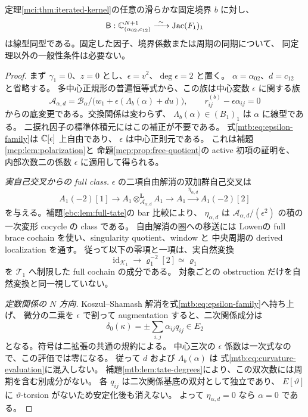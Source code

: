 \begin{proposition}[横断二項写像の可逆性]
\label{mtb:prop:transverse-iso}
定理\ref{mci:thm:iterated-kernel}の任意の滑らかな固定境界 $b$ に対し、
\begin{equation}\label{mtb:eq:transverse-iso}
 \mathsf B:\mathbb C^{N+1}_{(\alpha_{02},c_{12})}
         \xrightarrow{\ \sim\ }\operatorname{Jac}(F_1)_1
\end{equation}
は線型同型である。固定した因子、境界係数または周期の同期について、
同定理以外の一般性条件は必要ない。
\end{proposition}

\begin{proof}
まず $\gamma_1=0$、$z=0$ とし、$\epsilon=v^2$、$\deg\epsilon=2$ と置く。
$\alpha=\alpha_{02}$、$d=c_{12}$ と省略する。
多中心正規形の普遍恒等式から、この族は中心変数 $\epsilon$ に関する族
\begin{equation}\label{mtb:eq:epsilon-family}
 \mathcal A_{\alpha,d}=\mathcal B_\alpha/
       \bigl(w_1+\epsilon(\Lambda_b(\alpha)+du)\bigr),
 \qquad r_{ij}^{(b)}-\epsilon\alpha_{ij}=0
\end{equation}
からの底変更である。交換関係は変わらず、
$\Lambda_b(\alpha)\in (B_1)_1$ は $\alpha$ に線型である。
二捩れ因子の標準体積元にはこの補正が不要である。
式\eqref{mtb:eq:epsilon-family}は $\mathbb C[\epsilon]$ 上自由であり、
$\epsilon$ は中心正則元である。
これは補題\ref{mcp:lem:polarization}と
命題\ref{mcp:prop:free-quotient}の active 初項の証明を、
内部次数二の係数 $\epsilon$ に適用して得られる。

\emph{実自己交叉からの full class.}
$\epsilon$ の二項自由解消の双加群自己交叉は
\[
 A_1(-2)[1]\longrightarrow
 A_1\otimes_{\mathcal A_{\alpha,d}}^{\mathbf L}A_1
 \longrightarrow A_1\xrightarrow{\eta_{\alpha,d}}A_1(-2)[2]
\]
を与える。補題\ref{ebc:lem:full-tate}の bar 比較により、
$\eta_{\alpha,d}$ は $\mathcal A_{\alpha,d}/(\epsilon^2)$ の積の
一次変形 cocycle の class である。
自由解消の圏への移送には
Lowen\cite[Theorems~3.21, 4.15 and proof]{CMOLowenCharacteristic}の
full brace cochain を使い、singularity quotient、window と
中央周期の derived localization を通す。
従って以下の零項と一項は、実自然変換
\[
 \operatorname{id}_{\mathcal K_1}\longrightarrow
       \varrho_1^{-2}[2]\simeq\varrho_1
\]
を $\mathcal T_1$ へ制限した full cochain の成分である。
対象ごとの obstruction だけを自然変換と同一視していない。

\emph{定数関係の $N$ 方向.}
Koszul--Shamash 解消を式\eqref{mtb:eq:epsilon-family}へ持ち上げ、
微分の二乗を $\epsilon$ で割って augmentation すると、二次関係成分は
\begin{equation}\label{mtb:eq:curvature-evaluation}
            \delta_0(\kappa)=\pm\sum_{i,j}\alpha_{ij}q_{ij}\in E_2
\end{equation}
となる。符号は二拡張の共通の規約による。
中心三次の $\epsilon$ 係数は一次式なので、この評価では零になる。
従って $d$ および $\Lambda_b(\alpha)$ は
式\eqref{mtb:eq:curvature-evaluation}に混入しない。
補題\ref{mtb:lem:tate-degrees}により、この双次数には周期を含む別成分がない。
各 $q_{ij}$ は二次関係基底の双対として独立であり、
$E[\vartheta]$ に $\vartheta$-torsion がないため安定化後も消えない。
よって $\eta_{\alpha,d}=0$ なら $\alpha=0$ である。


\end{proof}
